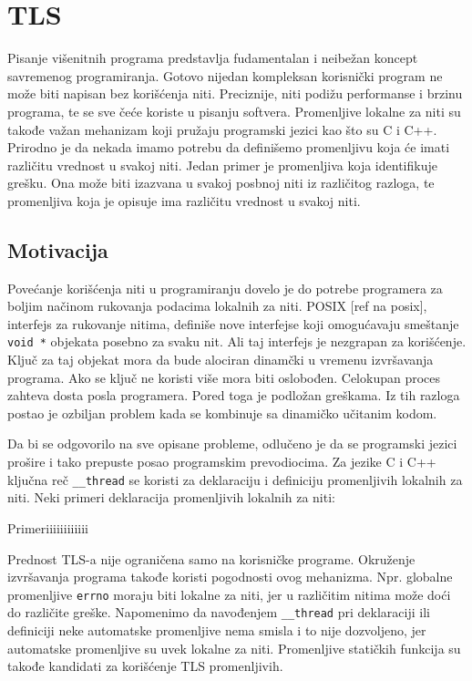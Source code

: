\documentclass[12pt,oneside]{memoir}
\begin{document}
\chapter{TLS}
\label{chp:TLS}

Pisanje višenitnih programa predstavlja fudamentalan i neibežan koncept savremenog programiranja. Gotovo nijedan kompleksan korisnički program ne može biti napisan bez korišćenja niti. Preciznije, niti podižu performanse i brzinu programa, te se sve čeće koriste u pisanju softvera. Promenljive lokalne za niti su takođe važan mehanizam koji pružaju programski jezici kao što su C i C++. Prirodno je da nekada imamo potrebu da definišemo promenljivu koja će imati različitu vrednost u svakoj niti. Jedan primer je promenljiva koja identifikuje grešku. Ona može biti izazvana u svakoj posbnoj niti iz različitog razloga, te promenljiva koja je opisuje ima različitu vrednost u svakoj niti.

\section{Motivacija}

Povećanje korišćenja niti u programiranju dovelo je do potrebe programera za boljim načinom rukovanja podacima lokalnih za niti. POSIX [ref na posix], interfejs za rukovanje nitima, definiše nove interfejse koji omogućavaju smeštanje \texttt{void *} objekata posebno za svaku nit. Ali taj interfejs je nezgrapan za korišćenje. Ključ za taj objekat mora da bude alociran dinamčki u vremenu izvršavanja programa. Ako se ključ ne koristi više mora biti oslobođen. Celokupan proces zahteva dosta posla programera. Pored toga je podložan greškama. Iz tih razloga postao je ozbiljan problem kada se kombinuje sa dinamičko učitanim kodom.

Da bi se odgovorilo na sve opisane probleme, odlučeno je da se programski jezici prošire i tako prepuste posao programskim prevodiocima. Za jezike C i C++ ključna reč \texttt{\_\_thread} se koristi za deklaraciju i definiciju promenljivih lokalnih za niti. Neki primeri deklaracija promenljivih lokalnih za niti:

Primeriiiiiiiiiiii

Prednost TLS-a nije ograničena samo na korisničke programe. Okruženje izvršavanja programa takođe koristi pogodnosti ovog mehanizma. Npr. globalne promenljive \texttt{errno} moraju biti lokalne za niti, jer u različitim nitima može doći do različite greške. Napomenimo da navođenjem \texttt{\_\_thread} pri deklaraciji ili definiciji neke automatske promenljive nema smisla i to nije dozvoljeno, jer automatske promenljive su uvek lokalne za niti. Promenljive statičkih funkcija su takođe kandidati za korišćenje TLS promenljivih.
\end{document}
